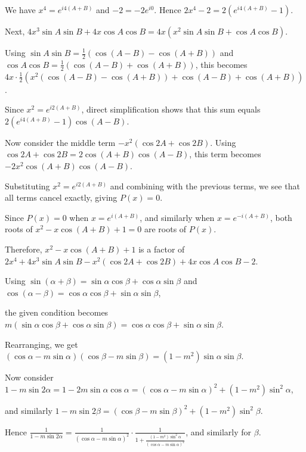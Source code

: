   We have $x^4 = e^{ i 4 ( A + B ) }$ and $-2 = -2 e^{ i 0 }$. Hence
  $2x^4 - 2 = 2 ( e^{ i 4 ( A + B ) } - 1 )$.

  Next, $4x^3 \sin A \sin B + 4x \cos A \cos B = 4x ( x^2 \sin A \sin B + \cos A \cos B )$.

  Using $\sin A \sin B = \frac{1}{2} ( \cos(A - B) - \cos(A + B) )$ and
  $\cos A \cos B = \frac{1}{2} ( \cos(A - B) + \cos(A + B) )$, this becomes
  $4x \cdot \frac{1}{2} ( x^2 ( \cos(A - B) - \cos(A + B) ) + \cos(A - B) + \cos(A + B) )$.

  Since $x^2 = e^{ i 2 ( A + B ) }$, direct simplification shows that this sum equals
  $2 \left( e^{ i 4 ( A + B ) } - 1 \right) \cos(A - B)$.

  Now consider the middle term $- x^2 ( \cos 2A + \cos 2B )$. Using
  $\cos 2A + \cos 2B = 2 \cos(A + B) \cos(A - B)$, this term becomes
  $- 2 x^2 \cos(A + B) \cos(A - B )$.

  Substituting $x^2 = e^{ i 2 ( A + B ) }$ and combining with the previous terms, we see that all terms
  cancel exactly, giving $P(x) = 0$.

  Since $P(x) = 0$ when $x = e^{ i ( A + B ) }$, and similarly when $x = e^{ - i ( A + B ) }$, both roots of
  $x^2 - x \cos(A + B) + 1 = 0$ are roots of $P(x)$.

  Therefore, $x^2 - x \cos(A + B) + 1$ is a factor of
  $2x^4 + 4x^3 \sin A \sin B - x^2 ( \cos 2A + \cos 2B ) + 4x \cos A \cos B - 2$.
\item Using $\sin(\alpha + \beta) = \sin\alpha \cos\beta + \cos\alpha \sin\beta$ and
  $\cos(\alpha - \beta) = \cos\alpha \cos\beta + \sin\alpha \sin\beta$,

  the given condition becomes
  $m ( \sin\alpha \cos\beta + \cos\alpha \sin\beta ) = \cos\alpha \cos\beta + \sin\alpha \sin\beta$.

  Rearranging, we get
  $( \cos\alpha - m \sin\alpha )( \cos\beta - m \sin\beta ) = ( 1 - m^2 ) \sin\alpha \sin\beta$.

  Now consider $1 - m \sin 2\alpha = 1 - 2m \sin\alpha \cos\alpha = ( \cos\alpha - m \sin\alpha )^2 + ( 1 -
  m^2 ) \sin^2\alpha$,

  and similarly $1 - m \sin 2\beta = ( \cos\beta - m \sin\beta )^2 + ( 1 - m^2 ) \sin^2\beta$.

  Hence $\frac{1}{1 - m \sin 2\alpha} = \frac{1}{( \cos\alpha - m \sin\alpha )^2} \cdot \frac{1}{1 + \frac{
      ( 1 - m^2 ) \sin^2\alpha }{ ( \cos\alpha - m \sin\alpha )^2 }}$,
  and similarly for $\beta$.

